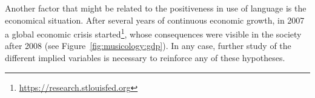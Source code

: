 Another factor that might be related to the positiveness in use of language is the economical situation. After several years of continuous economic growth, in 2007 a global economic crisis started\footnote{\url{https://research.stlouisfed.org}}, whose consequences were visible in the society after 2008 (see Figure~\ref{fig:musicology:gdp}). In any case, further study of the different implied variables is necessary to reinforce any of these hypotheses.




    


